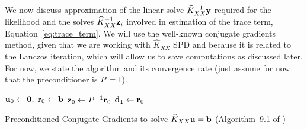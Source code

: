 \documentclass{article}
\begin{document}
We now discuss approximation of the linear solve $\widehat K_{XX}^{-1} \boldsymbol{\mathbf{y}}$ required for the likelihood and the solves $\widehat K_{XX}^{-1} \boldsymbol{\mathbf{z}}_i$ involved in estimation of the trace term, Equation~\eqref{eq:trace_term}. We will use the well-known conjugate gradients method, given that we are working with $\widehat K_{XX}$ SPD and because it is related to the Lanczos iteration, which will allow us to save computations as discussed later. For now, we state the algorithm and its convergence rate (just assume for now that the preconditioner is $P=\Id$).

\begin{algorithm}[H]
 \label{algo:pcg}
\SetAlgoLined
{}
\DontPrintSemicolon
{}
 $\boldsymbol{\mathbf{u}}_0 \leftarrow \boldsymbol{\mathbf{0}}, \; \boldsymbol{\mathbf{r}}_0 \leftarrow \boldsymbol{\mathbf{b}}$ \;
 $\boldsymbol{\mathbf{z}}_0 \leftarrow P^{-1} \boldsymbol{\mathbf{r}}_0$ \;
 $\boldsymbol{\mathbf{d}}_1 \leftarrow \boldsymbol{\mathbf{r}}_0$ \;
 
 \caption{Preconditioned Conjugate Gradients to solve $\widehat K_{XX} \boldsymbol{\mathbf{u}} = \boldsymbol{\mathbf{b}}$ (Algorithm~9.1 of \cite{saad_iterative_2003})}
\end{algorithm}
\end{document}
